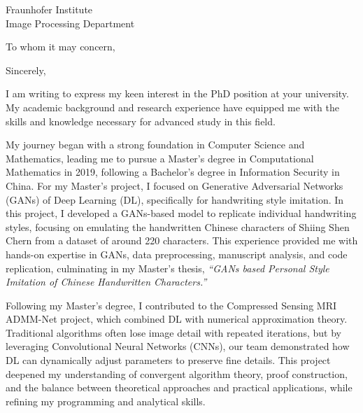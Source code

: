 \documentclass[11pt,a4paper, final]{moderncv}
\newcommand{\spacesubsection}{\vspace{0.2cm}}
\begin{document}
% 
\renewcommand{\refname}{\textbf{Publications}} 
{Fraunhofer Institute\\
Image Processing Department}
\date{\today}
\opening{To whom it may concern,}
\closing{Sincerely,}
\makelettertitle
\thispagestyle{empty}
\pagestyle{empty}
I am writing to express my keen interest in the PhD position at your university. 
My academic background and research experience have equipped me with the skills and knowledge 
necessary for advanced study in this field. 

My journey began with a strong foundation in Computer Science and Mathematics, 
leading me to pursue a Master's degree in Computational Mathematics in 2019, 
following a Bachelor's degree in Information Security in China. 
For my Master's project, I focused on Generative Adversarial Networks (GANs) of Deep Learning (DL), 
specifically for handwriting style imitation. 
In this project, I developed a GANs-based model to replicate individual handwriting styles, 
focusing on emulating the handwritten Chinese characters of Shiing Shen Chern from a dataset of around 220 characters. 
This experience provided me with hands-on expertise in GANs, 
data preprocessing, manuscript analysis, and code replication, 
culminating in my Master's thesis, \emph{``GANs based Personal Style Imitation of Chinese Handwritten Characters.''}

Following my Master's degree, 
I contributed to the Compressed Sensing MRI ADMM-Net project, 
which combined DL with numerical approximation theory. 
Traditional algorithms often lose image detail with repeated iterations, 
but by leveraging Convolutional Neural Networks (CNNs), 
our team demonstrated how DL can dynamically adjust parameters to preserve fine details. 
This project deepened my understanding of convergent algorithm theory, proof construction, 
and the balance between theoretical approaches and practical applications, 
while refining my programming and analytical skills.
\end{document}
